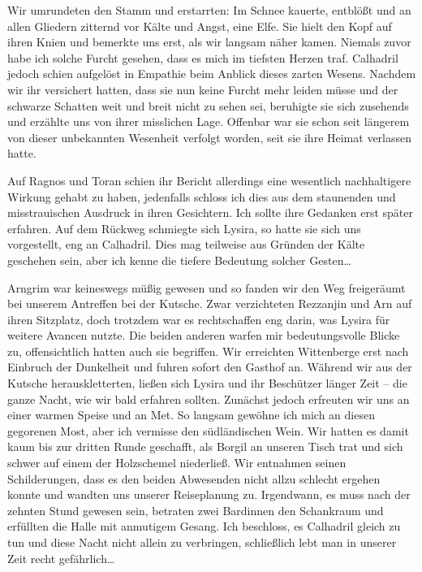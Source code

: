   
Wir umrundeten den Stamm und erstarrten: Im Schnee kauerte, entblößt und an allen Gliedern zitternd vor Kälte und Angst, eine Elfe. Sie hielt den Kopf auf ihren Knien und bemerkte uns erst, als wir langsam näher kamen. Niemals zuvor habe ich solche Furcht gesehen, dass es mich im tiefsten Herzen traf. Calhadril jedoch schien aufgelöst in Empathie beim Anblick dieses zarten Wesens. Nachdem wir ihr versichert hatten, dass sie nun keine Furcht mehr leiden müsse und der schwarze Schatten weit und breit nicht zu sehen sei, beruhigte sie sich zusehends und erzählte uns von ihrer misslichen Lage. Offenbar war sie schon seit längerem von dieser unbekannten Wesenheit verfolgt worden, seit sie ihre Heimat verlassen hatte. 


Auf Ragnos und Toran schien ihr Bericht allerdings eine wesentlich nachhaltigere Wirkung gehabt zu haben, jedenfalls schloss ich dies aus dem staunenden und misstrauischen Ausdruck in ihren Gesichtern. Ich sollte ihre Gedanken erst später erfahren. Auf dem Rückweg schmiegte sich Lysira, so hatte sie sich uns vorgestellt, eng an Calhadril. Dies mag teilweise aus Gründen der Kälte geschehen sein, aber ich kenne die tiefere Bedeutung solcher Gesten\dots


Arngrim war keineswegs müßig gewesen und so fanden wir den Weg freigeräumt bei unserem Antreffen bei der Kutsche. Zwar verzichteten Rezzanjin und Arn auf ihren Sitzplatz, doch trotzdem war es rechtschaffen eng darin, was Lysira für weitere Avancen nutzte. Die beiden anderen warfen mir bedeutungsvolle Blicke zu, offensichtlich hatten auch sie begriffen. Wir erreichten Wittenberge erst nach Einbruch der Dunkelheit und fuhren sofort den Gasthof an. Während wir aus der Kutsche herauskletterten, ließen sich Lysira und ihr Beschützer länger Zeit -- die ganze Nacht, wie wir bald erfahren sollten. Zunächst jedoch erfreuten wir uns an einer warmen Speise und an Met. So langsam gewöhne ich mich an diesen gegorenen Most, aber ich vermisse den südländischen Wein. Wir hatten es damit kaum bis zur dritten Runde geschafft, als Borgil an unseren Tisch trat und sich schwer auf einem der Holzschemel niederließ. Wir entnahmen seinen Schilderungen, dass es den beiden Abwesenden nicht allzu schlecht ergehen konnte und wandten uns unserer Reiseplanung zu. Irgendwann, es muss nach der zehnten Stund gewesen sein, betraten zwei Bardinnen den Schankraum und erfüllten die Halle mit anmutigem Gesang. Ich beschloss, es Calhadril gleich zu tun und diese Nacht nicht allein zu verbringen, schließlich lebt man in unserer Zeit recht gefährlich\dots



